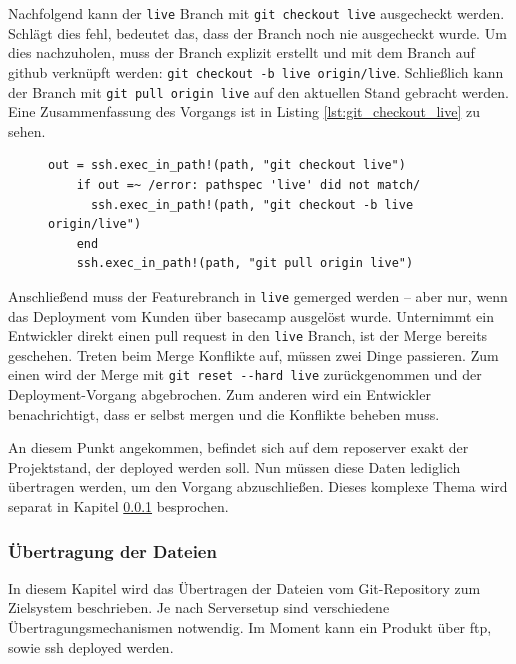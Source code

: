 Nachfolgend kann der \lstinline!live! Branch mit \lstinline!git checkout live! ausgecheckt werden. Schlägt dies fehl, bedeutet das, dass der Branch noch nie ausgecheckt wurde. Um dies nachzuholen, muss der Branch explizit erstellt und mit dem Branch auf \gls{github} verknüpft werden: \lstinline!git checkout -b live origin/live!. Schließlich kann der Branch mit \lstinline!git pull origin live! auf den aktuellen Stand gebracht werden. Eine Zusammenfassung des Vorgangs ist in Listing \ref{lst:git_checkout_live} zu sehen.

\begin{figure}
	\begin{lstlisting}[caption=Wechsel auf den aktualisierten Deployment Branch,label={lst:git_checkout_live}]
	out = ssh.exec_in_path!(path, "git checkout live")
	if out =~ /error: pathspec 'live' did not match/
	  ssh.exec_in_path!(path, "git checkout -b live origin/live")
	end
	ssh.exec_in_path!(path, "git pull origin live")
	\end{lstlisting}
\end{figure}

Anschließend muss der Featurebranch in \lstinline!live! gemerged werden -- aber nur, wenn das Deployment vom Kunden über \gls{basecamp} ausgelöst wurde. Unternimmt ein Entwickler direkt einen \gls{pull request} in den \lstinline!live! Branch, ist der Merge bereits geschehen. Treten beim Merge Konflikte auf, müssen zwei Dinge passieren. Zum einen wird der Merge mit \lstinline!git reset --hard live! zurückgenommen und der Deployment-Vorgang abgebrochen. Zum anderen wird ein Entwickler benachrichtigt, dass er selbst mergen und die Konflikte beheben muss.

An diesem Punkt angekommen, befindet sich auf dem \gls{reposerver} exakt der Projektstand, der deployed werden soll. Nun müssen diese Daten lediglich übertragen werden, um den Vorgang abzuschließen. Dieses komplexe Thema wird separat in Kapitel \ref{ssub:uebertragung_der_dateien} besprochen.


\subsubsection{Übertragung der Dateien} %
\label{ssub:uebertragung_der_dateien}

In diesem Kapitel wird das Übertragen der Dateien vom Git-Repository zum Zielsystem beschrieben. Je nach Serversetup sind verschiedene Übertragungsmechanismen notwendig. Im Moment kann ein Produkt über \gls{ftp}, sowie \gls{ssh} deployed werden.

